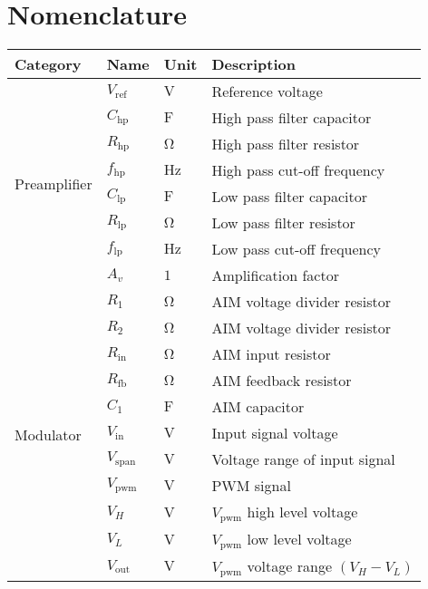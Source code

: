 \chapter*{Nomenclature} \label{cha:nomenclature}

\begin{longtable}{@{}llll@{}}
	\toprule
	\textbf{Category } & \textbf{Name}    & \textbf{Unit}        & \textbf{Description} \\ \midrule
	\endhead
	\multirow{8}{*}{Preamplifier}       & $V_{\mathrm{ref}}$ & $\si{\volt}$ & Reference voltage \\
	& $C_{\mathrm{hp}}$ & $\si{\farad}$ & High pass filter capacitor \\
	& $R_{\mathrm{hp}}$ & $\si{\ohm}$ & High pass filter resistor \\
	& $f_{\mathrm{hp}}$ & $\si{\hertz}$ & High pass cut-off frequency \\
	& $C_{\mathrm{lp}}$ & $\si{\farad}$ & Low pass filter capacitor \\
	& $R_{\mathrm{lp}}$ & $\si{\ohm}$ & Low pass filter resistor \\
	& $f_{\mathrm{lp}}$ & $\si{\hertz}$ & Low pass cut-off frequency \\
	& $A_{v}$ & $1$ & Amplification factor \\ \midrule
	\multirow{27}{*}{Modulator} & $R_{1}$ & $\si{\ohm}$ & AIM voltage divider resistor \\
	& $R_{2}$ & $\si{\ohm}$ & AIM voltage divider resistor \\
	& $R_{\mathrm{in}}$ & $\si{\ohm}$ & AIM input resistor \\
	& $R_{\mathrm{fb}}$ & $\si{\ohm}$ & AIM feedback resistor \\
	& $C_{1}$ & $\si{\farad}$ & AIM capacitor \\
	& $V_{\mathrm{in}}$ & $\si{\volt}$ & Input signal voltage \\
	& $V_{\mathrm{span}}$ & $\si{\volt}$ & Voltage range of input signal \\ %
	& $V_{\mathrm{pwm}}$ & $\si{\volt}$ & PWM signal \\
	& $V_{H}$ & $\si{\volt}$ & $V_{\mathrm{pwm}}$ high level voltage \\
	& $V_{L}$ & $\si{\volt}$ & $V_{\mathrm{pwm}}$ low level voltage \\
	& $V_{\mathrm{out}}$ & $\si{\volt}$ & $V_{\mathrm{pwm}}$ voltage range $\left( V_{H} - V_{L} \right) $ \\

\end{longtable}
